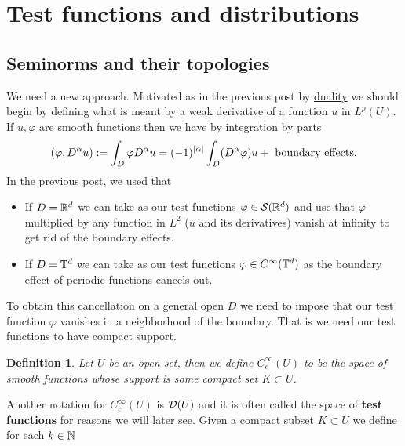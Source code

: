 \documentclass[12pt]{article}
\newtheorem{definition}{Definition}
\theoremstyle{remark}
\begin{document}
\section{Test functions and distributions}%
\subsection{Seminorms and their topologies}
We need a new approach. Motivated as in the previous post by \href{https://nowheredifferentiable.com/2023-01-29-PDE-1-Fourier/#:~:text=is%20called%20the-,duality,-method%20and%20appears}{duality} we should begin by defining what is meant by a weak derivative of a function $u$ in $L^p(U)$. If $u,\varphi$ are smooth functions then we have by integration by parts
\begin{align*}
	(\varphi, D^\alpha u):= \int_{D} \varphi D^\alpha u  = (-1)^{\left| \alpha \right| }\int_{D}(D^{\alpha} \varphi) u + \text{ boundary effects}  .
\end{align*}
In the previous post, we used that
\begin{itemize}
	\item If $D =\mathbb{R}^d$ we can take as our test functions $\varphi \in  \mathcal{S}(\mathbb{R}^d)$ and use that $\varphi$ multiplied by any function in $L^2$ ($u$ and its derivatives) vanish at infinity to get rid of the boundary effects.
	\item If $D =\mathbb{T}^d$ we can take as our test functions $\varphi \in  C^\infty(\mathbb{T}^d)$ as the boundary effect of periodic functions cancels out.
\end{itemize}
To obtain this cancellation on a general open $D$ we need to impose that our test function  $\varphi$ vanishes in a neighborhood of the boundary. That is we need our test functions to have compact support.
\begin{definition}
	Let $U$ be an open set, then we define  $C_c^\infty(U)$ to be the space of smooth functions whose support is some compact set $K \subset U$.     \end{definition}
Another notation for $C^\infty_c(U)$ is $\mathcal{D}(U)$ and it is often called the space of \textbf{test functions} for reasons we will later see.  Given a compact subset $K \subset U$  we define for each $k \in \mathbb{N}$
\end{document}
